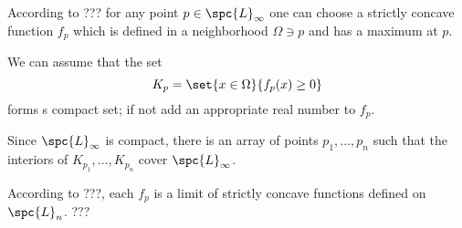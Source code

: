 According to ??? for any point $p\in\spc{L}_\infty$ 
one can choose a strictly concave function $f_p$ 
which is defined in a neighborhood $\Omega\ni p$ 
and has a maximum at $p$.

We can assume that the set 
\[K_p=\set{x\in\Omega}{f_p(x)\ge0}\] 
forms s compact set; if not add an appropriate real number to $f_p$.

Since $\spc{L}_\infty$ is compact, there is an array of points $p_1,\dots,p_n$
such that the interiors of $K_{p_1},\dots,K_{p_n}$ cover $\spc{L}_\infty$.

According to ???, each $f_p$ is a limit of strictly concave functions defined on $\spc{L}_n$.
???
\qeds